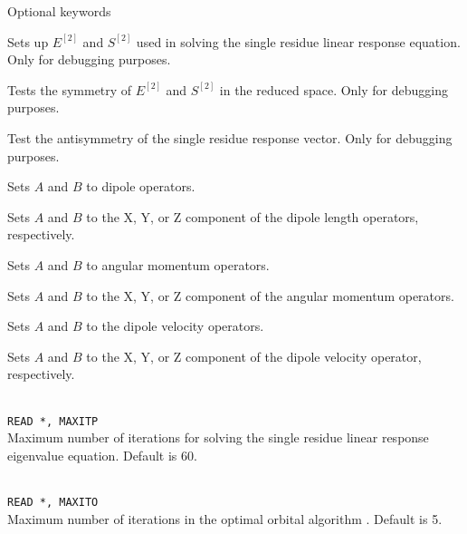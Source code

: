 Optional keywords

\begin{description}

\item{} Sets up $E^{\left[2\right]}$
  and $S^{\left[2\right]}$ used in solving the
  single residue linear response equation. Only for debugging purposes.

\item{} Tests the symmetry of $E^{\left[2\right]}$
  and $S^{\left[2\right]}$ in the reduced space.
  Only for debugging purposes.

\item{} Test the antisymmetry of the single residue response
  vector. Only for debugging purposes.

\item{}
Sets $A$ and $B$ to dipole operators.

\item{}
Sets $A$ and $B$ to the X, Y, or Z component of the dipole length operators, respectively.

\item{}
Sets $A$ and $B$ to angular momentum operators.

\item{}
Sets $A$ and $B$ to the X, Y, or Z component of the angular momentum operators.

\item{}
Sets $A$ and $B$ to the dipole velocity operators.

\item{}
Sets $A$ and $B$ to the X, Y, or Z component of the dipole velocity
operator, respectively.

\item{}\\
\verb|READ *, MAXITP|\\
Maximum number of iterations for solving the single residue
linear response eigenvalue equation. Default is 60.

\item{}\\
\verb|READ *, MAXITO|\\
Maximum number of iterations in the optimal orbital
algorithm
\cite{tuhjahjajpjjcp84}.
Default is 5.


\end{description}
